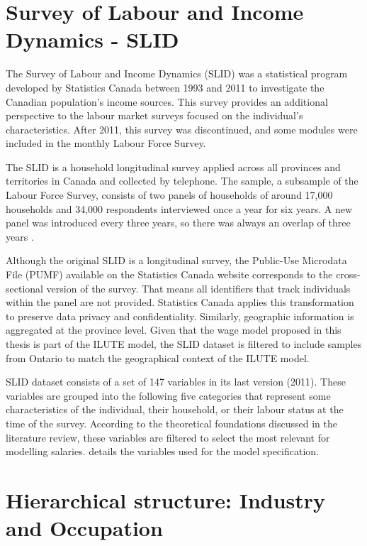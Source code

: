 

\section{Survey of Labour and Income Dynamics - SLID }

The Survey of Labour and Income Dynamics (SLID) was a statistical program developed by Statistics Canada between 1993 and 2011 to investigate the Canadian population's income sources. This survey provides an additional perspective to the labour market surveys focused on the individual's characteristics. After 2011, this survey was discontinued, and some modules were included in the monthly Labour Force Survey. 

The SLID is a household longitudinal survey applied across all provinces and territories in Canada and collected by telephone. The sample, a subsample of the Labour Force Survey, consists of two panels of households of around 17,000 households and 34,000 respondents interviewed once a year for six years. A new panel was introduced every three years, so there was always an overlap of three years \citep{StatsCAN2012}. 

Although the original SLID is a longitudinal survey, the Public-Use Microdata File (PUMF) available on the Statistics Canada website corresponds to the cross-sectional version of the survey. That means all identifiers that track individuals within the panel are not provided. Statistics Canada applies this transformation to preserve data privacy and confidentiality. Similarly, geographic information is aggregated at the province level. Given that the wage model proposed in this thesis is part of the ILUTE model, the SLID dataset is filtered to include samples from Ontario to match the geographical context of the ILUTE model. 

SLID dataset consists of a set of 147 variables in its last version (2011). These variables are grouped into the following five categories that represent some characteristics of the individual, their household, or their labour status at the time of the survey. According to the theoretical foundations discussed in the literature review, these variables are filtered to select the most relevant for modelling salaries.  details the variables used for the model specification. 



\section{Hierarchical structure: Industry and Occupation}\label{section:hierarchy}

